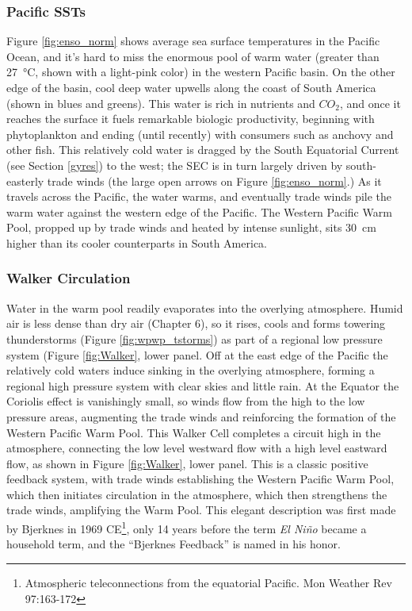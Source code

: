 {\subsubsection{Pacific SSTs}
Figure \ref{fig:enso_norm} shows average sea surface temperatures in the Pacific Ocean, and it's hard to miss the enormous pool of warm water (greater than \SI{27}{\celsius}, shown with a light-pink color) in the western Pacific basin. On the other edge of the basin, cool deep water upwells along the coast of South America (shown in blues and greens). This water is rich in nutrients and $CO_2$, and once it reaches the surface it fuels remarkable biologic productivity, beginning with phytoplankton and ending (until recently) with consumers such as anchovy and other fish. This relatively cold water is dragged by the South Equatorial Current (see Section \ref{gyres}) to the west; the SEC is in turn largely driven by south-easterly trade winds (the large open arrows on Figure \ref{fig:enso_norm}.) As it travels across the Pacific, the water warms, and eventually trade winds pile the warm water against the western edge of the Pacific. The Western Pacific Warm Pool, propped up by trade winds and heated by intense sunlight, sits \SI{30}{\centi\metre} higher than its cooler counterparts in South America.  
\subsubsection{Walker Circulation}
Water in the warm pool readily evaporates into the overlying atmosphere. Humid air is less dense than dry air (Chapter 6), so it rises, cools and forms towering thunderstorms (Figure \ref{fig:wpwp_tstorms}) as part of a regional low pressure system (Figure \ref{fig:Walker}, lower panel.  Off at the east edge of the Pacific the relatively cold waters induce sinking in the overlying atmosphere, forming a regional high pressure system with clear skies and little rain. At the Equator the Coriolis effect is vanishingly small, so winds flow from the high to the low pressure areas, augmenting the trade winds and reinforcing the formation of the Western Pacific Warm Pool. This Walker Cell completes a circuit high in the atmosphere, connecting the low level westward flow with a high level eastward flow, as shown in Figure \ref{fig:Walker}, lower panel. This is a classic positive feedback system, with trade winds establishing the Western Pacific Warm Pool, which then initiates circulation in the atmosphere, which then strengthens the trade winds, amplifying the Warm Pool. This elegant description was first made by Bjerknes in 1969 CE\footnote{Atmospheric teleconnections from the equatorial Pacific. Mon Weather Rev 97:163-172}, only 14 years before the term \textit{El Ni\~no} became a household term, and the ``Bjerknes Feedback'' is named in his honor.
}
